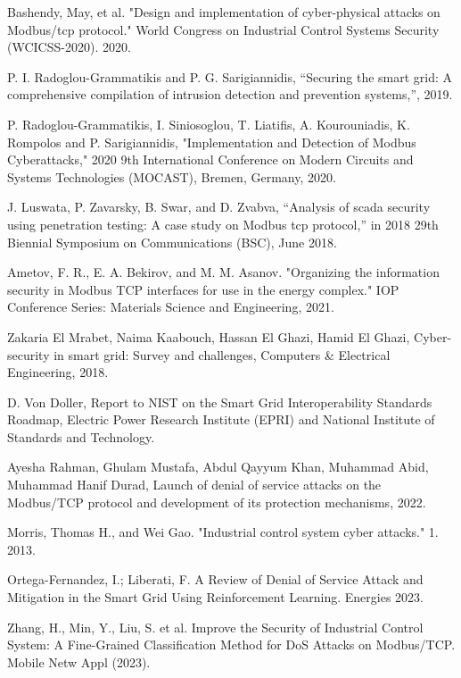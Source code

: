 \documentclass[letterpaper,10pt,conference]{IEEEtran}
\begin{document}
\begin{thebibliography}{00}
 Bashendy, May, et al. "Design and implementation of cyber-physical attacks on Modbus/tcp protocol." World Congress on Industrial Control Systems Security (WCICSS-2020). 2020.


 P. I. Radoglou-Grammatikis and P. G. Sarigiannidis, “Securing the smart
grid: A comprehensive compilation of intrusion detection and prevention
systems,”, 2019.


P. Radoglou-Grammatikis, I. Siniosoglou, T. Liatifis, A. Kourouniadis, K. Rompolos and P. Sarigiannidis, "Implementation and Detection of Modbus Cyberattacks," 2020 9th International Conference on Modern Circuits and Systems Technologies (MOCAST), Bremen, Germany, 2020.

 J. Luswata, P. Zavarsky, B. Swar, and D. Zvabva, “Analysis of scada
security using penetration testing: A case study on Modbus tcp protocol,”
in 2018 29th Biennial Symposium on Communications (BSC), June 2018.

Ametov, F. R., E. A. Bekirov, and M. M. Asanov. "Organizing the information security in Modbus TCP interfaces for use in the energy complex." IOP Conference Series: Materials Science and Engineering, 2021.

Zakaria El Mrabet, Naima Kaabouch, Hassan El Ghazi, Hamid El Ghazi,
Cyber-security in smart grid: Survey and challenges,
Computers \& Electrical Engineering, 2018.

D. Von Doller, 
Report to NIST on the Smart Grid Interoperability Standards Roadmap,
Electric Power Research Institute (EPRI) and National Institute of Standards and Technology.


Ayesha Rahman, Ghulam Mustafa, Abdul Qayyum Khan, Muhammad Abid, Muhammad Hanif Durad,
Launch of denial of service attacks on the Modbus/TCP protocol and development of its protection mechanisms, 2022.

Morris, Thomas H., and Wei Gao. "Industrial control system cyber attacks."  1. 2013.

Ortega-Fernandez, I.; Liberati, F. A Review of Denial of Service Attack and Mitigation in the Smart Grid Using Reinforcement Learning. Energies 2023.

Zhang, H., Min, Y., Liu, S. et al. Improve the Security of Industrial Control System: A Fine-Grained Classification Method for DoS Attacks on Modbus/TCP. Mobile Netw Appl (2023). 


\end{thebibliography}
\end{document}
